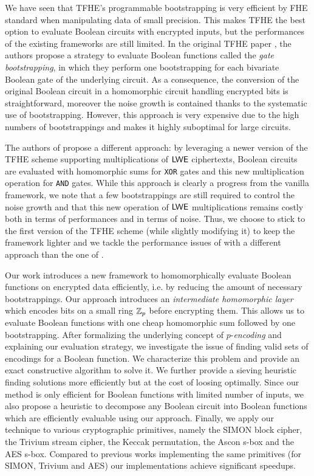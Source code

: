 

We have seen that TFHE's programmable bootstrapping is very efficient by FHE standard when manipulating data of small precision. This makes TFHE the best option to evaluate Boolean circuits with encrypted inputs, but the performances of the existing frameworks are still limited. In the original TFHE paper \cite{JC:CGGI20}, the authors propose a strategy to evaluate Boolean functions called the \emph{gate bootstrapping}, in which they perform one bootstrapping for each bivariate Boolean gate of the underlying circuit. As a consequence, the conversion of the original Boolean circuit in a homomorphic circuit handling encrypted bits is straightforward, moreover the noise growth is contained thanks to the systematic use of bootstrapping. However, this approach is very expensive due to the high numbers of bootstrappings and makes it highly suboptimal for large circuits.

The authors of \cite{AC:CLOT21} propose a different approach: by leveraging a newer version of the TFHE scheme supporting multiplications of $\textsf{LWE}$ ciphertexts, Boolean circuits are evaluated with homomorphic sums for \texttt{XOR} gates and this new multiplication operation for \texttt{AND} gates. While this approach is clearly a progress from the vanilla framework, we note that a few bootstrappings are still required to control the noise growth and that this new operation of $\textsf{LWE}$ multiplications remains costly both in terms of performances and in terms of noise. Thus, we choose to stick to the first version of the TFHE scheme (while slightly modifying it) to keep the framework lighter and we tackle the performance issues of \cite{JC:CGGI20} with a different approach than the one of \cite{AC:CLOT21}.

Our work introduces a new framework to homomorphically evaluate Boolean functions on encrypted data efficiently, i.e. by reducing the amount of necessary bootstrappings. Our approach introduces an \emph{intermediate homomorphic layer} which encodes bits on a small ring $\mathbb{Z}_p$ before encrypting them. This allows us to evaluate Boolean functions with one cheap homomorphic sum followed by one bootstrapping. After formalizing the underlying concept of $p$-\emph{encoding} and explaining our evaluation strategy, we investigate the issue of finding valid sets of encodings for a Boolean function. We characterize this problem and provide an exact constructive algorithm to solve it. We further provide a sieving heuristic finding solutions more efficiently but at the cost of loosing optimally. Since our method is only efficient for Boolean functions with limited number of inputs, we also propose a heuristic to decompose any Boolean circuit into Boolean functions which are efficiently evaluable using our approach. Finally, we apply our technique to various cryptographic primitives, namely the SIMON block cipher, the Trivium stream cipher, the Keccak permutation, the Ascon s-box and the AES s-box. Compared to previous works implementing the same primitives (for SIMON, Trivium and AES) our implementations achieve significant speedups.

